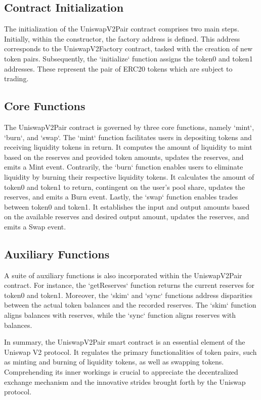 \documentclass[sigconf, authordraft]{acmart}
\begin{document}
	\subsection{Contract Initialization}


	The initialization of the UniswapV2Pair contract comprises two main steps.
	Initially, within the constructor, the factory address is defined. This address
	corresponds to the UniswapV2Factory contract, tasked with the creation of new
	token pairs. Subsequently, the `initialize` function assigns the token0 and
	token1 addresses. These represent the pair of ERC20 tokens which are subject to
	trading.

	\subsection{Core Functions}


	The UniswapV2Pair contract is governed by three core functions, namely `mint`,
	`burn`, and `swap`. The `mint` function facilitates users in depositing tokens
	and receiving liquidity tokens in return. It computes the amount of liquidity
	to mint based on the reserves and provided token amounts, updates the reserves,
	and emits a Mint event. Contrarily, the `burn` function enables users to
	eliminate liquidity by burning their respective liquidity tokens. It calculates
	the amount of token0 and token1 to return, contingent on the user's pool share,
	updates the reserves, and emits a Burn event. Lastly, the `swap` function
	enables trades between token0 and token1. It establishes the input and output amounts
	based on the available reserves and desired output amount, updates the
	reserves, and emits a Swap event.

	\subsection{Auxiliary Functions}


	A suite of auxiliary functions is also incorporated within the UniswapV2Pair contract.
	For instance, the `getReserves` function returns the current reserves for token0
	and token1. Moreover, the `skim` and `sync` functions address disparities between
	the actual token balances and the recorded reserves. The `skim` function
	aligns balances with reserves, while the `sync` function aligns reserves with balances.

	In summary, the UniswapV2Pair smart contract is an essential element of the
	Uniswap V2 protocol. It regulates the primary functionalities of token pairs,
	such as minting and burning of liquidity tokens, as well as swapping tokens.
	Comprehending its inner workings is crucial to appreciate the decentralized
	exchange mechanism and the innovative strides brought forth by the Uniswap
	protocol.
\end{document}
